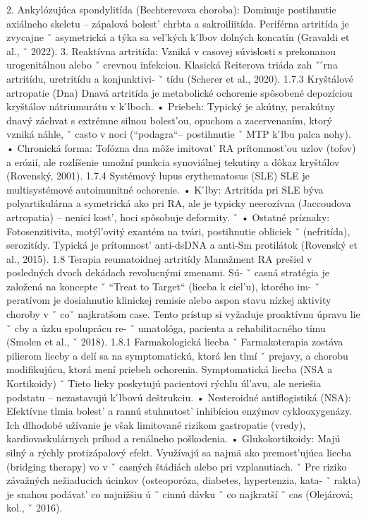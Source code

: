{ 2. Ankylózujúca spondylitída (Bechterevova choroba): Dominuje postihnutie axiálneho skeletu – zápalová bolest’ chrbta a sakroiliitída. Periférna artritída je zvycajne ˇ asymetrická a týka sa vel’kých k ́lbov dolných koncatín (Gravaldi et al., ˇ 2022).
 3. Reaktívna artritída: Vzniká v casovej súvislosti s prekonanou urogenitálnou alebo ˇ crevnou infekciou. Klasická Reiterova triáda zah ˇ  ́rna artritídu, uretritídu a konjunktivi- ˇ tídu (Scherer et al., 2020).
 1.7.3 Kryštálové artropatie (Dna) Dnavá artritída je metabolické ochorenie spôsobené depozíciou kryštálov nátriumurátu v k ́lboch.
 • Priebeh: Typický je akútny, perakútny dnavý záchvat s extrémne silnou bolest’ou, opuchom a zacervenaním, ktorý vzniká náhle, ˇ casto v noci (``podagra``– postihnutie ˇ MTP k ́lbu palca nohy).
 • Chronická forma: Tofózna dna môže imitovat’ RA prítomnost’ou uzlov (tofov) a erózií, ale rozlíšenie umožní punkcia synoviálnej tekutiny a dôkaz kryštálov (Rovenský, 2001).
 1.7.4 Systémový lupus erythematosus (SLE) SLE je multisystémové autoimunitné ochorenie.
 • K ́lby: Artritída pri SLE býva polyartikulárna a symetrická ako pri RA, ale je typicky neerozívna (Jaccoudova artropatia) – nenicí kost’, hoci spôsobuje deformity. ˇ • Ostatné príznaky: Fotosenzitivita, motýl’ovitý exantém na tvári, postihnutie obliciek ˇ (nefritída), serozitídy. Typická je prítomnost’ anti-dsDNA a anti-Sm protilátok (Rovenský et al., 2015).
 1.8 Terapia reumatoidnej artritídy Manažment RA prešiel v posledných dvoch dekádach revolucnými zmenami. Sú- ˇ casná stratégia je založená na koncepte ˇ ``Treat to Target`` (liecba k ciel’u), ktorého im- ˇ peratívom je dosiahnutie klinickej remisie alebo aspon stavu nízkej aktivity choroby v ˇ coˇ najkratšom case. Tento prístup si vyžaduje proaktívnu úpravu lie ˇ cby a úzku spoluprácu re- ˇ umatológa, pacienta a rehabilitacného tímu (Smolen et al., ˇ 2018).
 1.8.1 Farmakologická liecba ˇ Farmakoterapia zostáva pilierom liecby a delí sa na symptomatickú, ktorá len tlmí ˇ prejavy, a chorobu modifikujúcu, ktorá mení priebeh ochorenia.
 Symptomatická liecba (NSA a Kortikoidy) ˇ Tieto lieky poskytujú pacientovi rýchlu úl’avu, ale neriešia podstatu – nezastavujú k ́lbovú deštrukciu.
 • Nesteroidné antiflogistiká (NSA): Efektívne tlmia bolest’ a rannú stuhnutost’ inhibíciou enzýmov cyklooxygenázy. Ich dlhodobé užívanie je však limitované rizikom gastropatie (vredy), kardiovaskulárnych príhod a renálneho poškodenia.
 • Glukokortikoidy: Majú silný a rýchly protizápalový efekt. Využívajú sa najmä ako premost’ujúca liecba (bridging therapy) vo v ˇ casných štádiách alebo pri vzplanutiach. ˇ Pre riziko závažných nežiaducich úcinkov (osteoporóza, diabetes, hypertenzia, kata- ˇ rakta) je snahou podávat’ co najnižšiu ú ˇ cinnú dávku ˇ co najkratší ˇ cas (Olejárová; kol., ˇ 2016).
}
